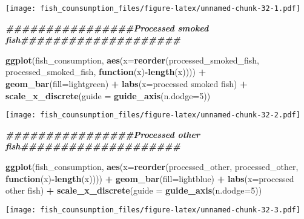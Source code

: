 \documentclass[
]{article}
\newenvironment{Shaded}{\begin{snugshade}}{\end{snugshade}}
\newcommand{\AttributeTok}[1]{\textcolor[rgb]{0.13,0.29,0.53}{#1}}
\newcommand{\ControlFlowTok}[1]{\textcolor[rgb]{0.13,0.29,0.53}{\textbf{#1}}}
\newcommand{\DecValTok}[1]{\textcolor[rgb]{0.00,0.00,0.81}{#1}}
\newcommand{\DocumentationTok}[1]{\textcolor[rgb]{0.56,0.35,0.01}{\textbf{\textit{#1}}}}
\newcommand{\FunctionTok}[1]{\textcolor[rgb]{0.13,0.29,0.53}{\textbf{#1}}}
\newcommand{\NormalTok}[1]{#1}
\newcommand{\SpecialCharTok}[1]{\textcolor[rgb]{0.81,0.36,0.00}{\textbf{#1}}}
\newcommand{\StringTok}[1]{\textcolor[rgb]{0.31,0.60,0.02}{#1}}
\begin{document}
\texttt{[image: fish\_counsumption\_files/figure-latex/unnamed-chunk-32-1.pdf]}

\begin{Shaded}
\begin{Highlighting}[]
\DocumentationTok{\#\#\#\#\#\#\#\#\#\#\#\#\#\#\#\#Processed smoked fish\#\#\#\#\#\#\#\#\#\#\#\#\#\#\#\#\#\#\#\#}

\FunctionTok{ggplot}\NormalTok{(fish\_consumption, }\FunctionTok{aes}\NormalTok{(}\AttributeTok{x=}\FunctionTok{reorder}\NormalTok{(processed\_smoked\_fish, processed\_smoked\_fish, }\ControlFlowTok{function}\NormalTok{(x)}\SpecialCharTok{{-}}\FunctionTok{length}\NormalTok{(x)))) }\SpecialCharTok{+}
  \FunctionTok{geom\_bar}\NormalTok{(}\AttributeTok{fill=}\StringTok{\textquotesingle{}lightgreen\textquotesingle{}}\NormalTok{) }\SpecialCharTok{+} 
  \FunctionTok{labs}\NormalTok{(}\AttributeTok{x=}\StringTok{\textquotesingle{}processed smoked fish\textquotesingle{}}\NormalTok{) }\SpecialCharTok{+}
  \FunctionTok{scale\_x\_discrete}\NormalTok{(}\AttributeTok{guide =} \FunctionTok{guide\_axis}\NormalTok{(}\AttributeTok{n.dodge=}\DecValTok{5}\NormalTok{))}
\end{Highlighting}
\end{Shaded}

\texttt{[image: fish\_counsumption\_files/figure-latex/unnamed-chunk-32-2.pdf]}

\begin{Shaded}
\begin{Highlighting}[]
\DocumentationTok{\#\#\#\#\#\#\#\#\#\#\#\#\#\#\#\#Processed other fish\#\#\#\#\#\#\#\#\#\#\#\#\#\#\#\#\#\#\#\#}

\FunctionTok{ggplot}\NormalTok{(fish\_consumption, }\FunctionTok{aes}\NormalTok{(}\AttributeTok{x=}\FunctionTok{reorder}\NormalTok{(processed\_other, processed\_other, }\ControlFlowTok{function}\NormalTok{(x)}\SpecialCharTok{{-}}\FunctionTok{length}\NormalTok{(x)))) }\SpecialCharTok{+}
  \FunctionTok{geom\_bar}\NormalTok{(}\AttributeTok{fill=}\StringTok{\textquotesingle{}lightblue\textquotesingle{}}\NormalTok{) }\SpecialCharTok{+} 
  \FunctionTok{labs}\NormalTok{(}\AttributeTok{x=}\StringTok{\textquotesingle{}processed other fish\textquotesingle{}}\NormalTok{) }\SpecialCharTok{+}
  \FunctionTok{scale\_x\_discrete}\NormalTok{(}\AttributeTok{guide =} \FunctionTok{guide\_axis}\NormalTok{(}\AttributeTok{n.dodge=}\DecValTok{5}\NormalTok{))}
\end{Highlighting}
\end{Shaded}

\texttt{[image: fish\_counsumption\_files/figure-latex/unnamed-chunk-32-3.pdf]}
\end{document}
